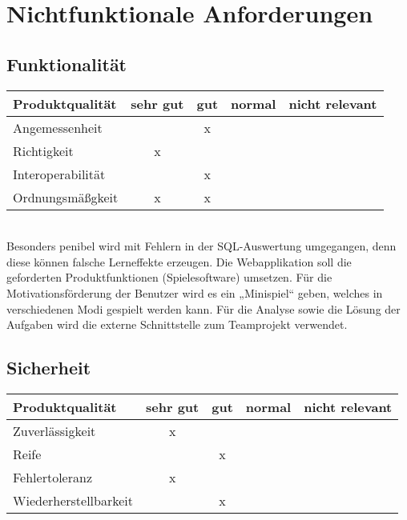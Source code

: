 

\chapter{Nichtfunktionale Anforderungen}

\section{Funktionalität}
\begin{tabular}{|l|c|c|c|c|}
	\hline
	\textbf{Produktqualität} & \textbf{sehr gut} & \textbf{gut} & \textbf{normal} & \textbf{nicht relevant} \\ 
	\hline
	Angemessenheit           &                   &      x       &                 &                         \\ 
	\hline
	Richtigkeit              &         x         &              &                 &                         \\
	\hline
	Interoperabilität        &                  &      x       &                 &                         \\ 
	\hline
	Ordnungsmäßgkeit         &         x         &      x        &                 &                         \\ 
	\hline
\end{tabular}\\

Besonders penibel wird mit Fehlern in der SQL-Auswertung umgegangen, denn diese können falsche Lerneffekte erzeugen.
Die Webapplikation soll die geforderten Produktfunktionen (Spielesoftware) umsetzen. Für die Motivationsförderung der Benutzer 
wird es ein „Minispiel“ geben, welches in verschiedenen Modi gespielt werden kann. Für die Analyse sowie die Lösung der Aufgaben 
wird die externe Schnittstelle zum Teamprojekt verwendet. 

\section{Sicherheit}

\begin{tabular}{|l|c|c|c|c|}
	\hline
	\textbf{Produktqualität} & \textbf{sehr gut} & \textbf{gut} & \textbf{normal} & \textbf{nicht relevant} \\ \hline
	Zuverlässigkeit          &         x          &              &                 &                        \\ 
	\hline
	Reife                    &                  &       x       &                 &                         \\ 
	\hline
	Fehlertoleranz           &         x          &              &                &                         \\ 
	\hline
	Wiederherstellbarkeit    &                 &       x       &                 &                         \\ 
	\hline
\end{tabular}\\

